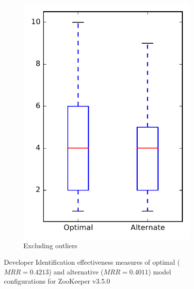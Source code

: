 \begin{figure}
\begin{subfigure}{.4\textwidth}
        \includegraphics[height=0.4\textheight]{figures/combo/dit_rq1_zookeeper_no_outlier}
        \caption{Excluding outliers}\label{fig:combo:dit:rq1:zookeeper_no_outlier}
    \end{subfigure}
\caption[Developer Identification effectiveness measures of optimal and alternative model configurations for ZooKeeper v3.5.0]%
{Developer Identification effectiveness measures of optimal ($MRR=0.4213$) and alternative ($MRR=0.4011$) model configurations for ZooKeeper v3.5.0}
\label{fig:combo:dit:rq1:zookeeper}
\end{figure}
